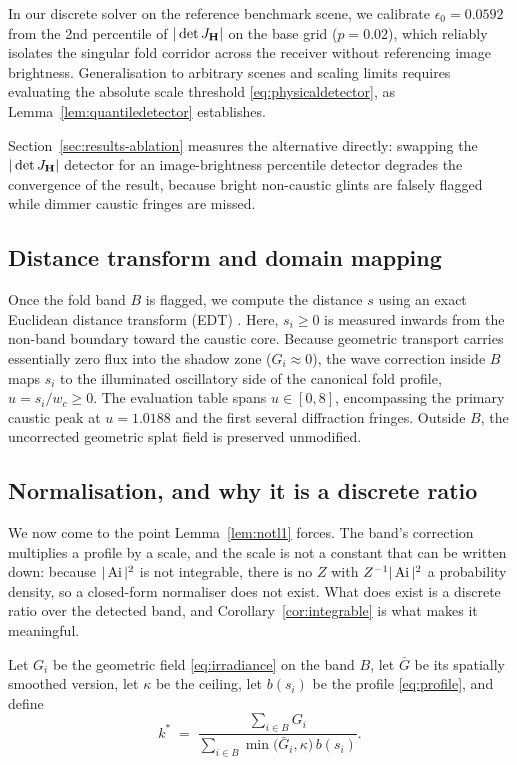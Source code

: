 In our discrete solver on the reference benchmark scene, we calibrate $\epsilon_0 = 0.0592$
from the 2nd percentile of $|\det J_{\mathbf{H}}|$ on the base grid ($p = 0.02$), which
reliably isolates the singular fold corridor across the receiver without referencing
image brightness. Generalisation to arbitrary scenes and scaling limits requires evaluating the absolute scale threshold \eqref{eq:physicaldetector}, as Lemma~\ref{lem:quantiledetector} establishes.

Section~\ref{sec:results-ablation} measures the alternative directly: swapping
the $|\det J_{\mathbf{H}}|$ detector for an image-brightness percentile detector degrades the
convergence of the result, because bright non-caustic glints are falsely flagged
while dimmer caustic fringes are missed.

\subsection{Distance transform and domain mapping}
\label{sec:ours-distance}

Once the fold band $B$ is flagged, we compute the distance $s$ using an exact
Euclidean distance transform (EDT) \cite{felzenszwalb2012}. 
Here, $s_i \ge 0$ is measured inwards from the non-band boundary toward the caustic core.
Because geometric transport carries essentially zero flux into the shadow zone ($G_i \approx 0$),
the wave correction inside $B$ maps $s_i$ to the illuminated oscillatory side of the
canonical fold profile, $u = s_i / w_c \ge 0$. The evaluation table spans $u \in [0, 8]$,
encompassing the primary caustic peak at $u = 1.0188$ and the first several diffraction fringes.
Outside $B$, the uncorrected geometric splat field is preserved unmodified.

\subsection{Normalisation, and why it is a discrete ratio}
\label{sec:ours-normalisation}

We now come to the point Lemma~\ref{lem:notl1} forces. The band's correction
multiplies a profile by a scale, and the scale is not a constant that can be
written down: because $|\operatorname{Ai}|^2$ is not integrable, there is no $Z$ with
$Z^{-1}|\operatorname{Ai}|^2$ a probability density, so a closed-form normaliser does not
exist. What does exist is a discrete ratio over the detected band, and
Corollary~\ref{cor:integrable} is what makes it meaningful.

Let $G_i$ be the geometric field \eqref{eq:irradiance} on the band $B$, let
$\bar G$ be its spatially smoothed version, let $\kappa$ be the ceiling,
let $b(s_i)$ be the profile \eqref{eq:profile}, and define
\begin{equation}
k^{*} \;=\;
\frac{\displaystyle \sum_{i \in B} G_i}
     {\displaystyle \sum_{i \in B} \min\!\big(\bar G_i, \kappa\big)\, b(s_i)} .
\label{eq:kstar}
\end{equation}

